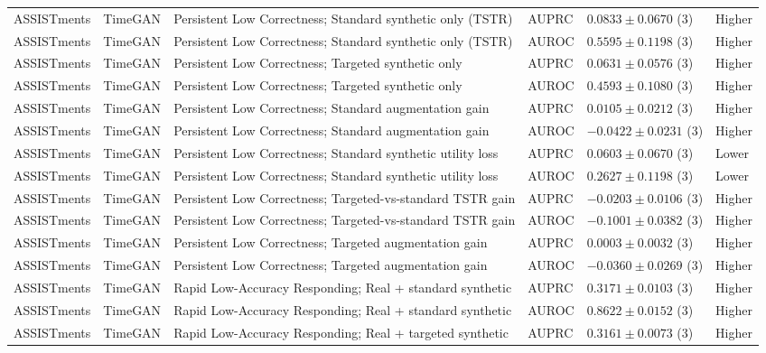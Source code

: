 \begin{longtable}{@{}p{2.25cm}p{2.05cm}p{4.7cm}p{5.0cm}p{2.6cm}p{1.25cm}@{}}
ASSISTments & TimeGAN & Persistent Low Correctness; Standard synthetic only (TSTR) & AUPRC & $0.0833 \mathbin{\pm} 0.0670$ (3) & Higher \\
ASSISTments & TimeGAN & Persistent Low Correctness; Standard synthetic only (TSTR) & AUROC & $0.5595 \mathbin{\pm} 0.1198$ (3) & Higher \\
ASSISTments & TimeGAN & Persistent Low Correctness; Targeted synthetic only & AUPRC & $0.0631 \mathbin{\pm} 0.0576$ (3) & Higher \\
ASSISTments & TimeGAN & Persistent Low Correctness; Targeted synthetic only & AUROC & $0.4593 \mathbin{\pm} 0.1080$ (3) & Higher \\
ASSISTments & TimeGAN & Persistent Low Correctness; Standard augmentation gain & AUPRC & $0.0105 \mathbin{\pm} 0.0212$ (3) & Higher \\
ASSISTments & TimeGAN & Persistent Low Correctness; Standard augmentation gain & AUROC & $-0.0422 \mathbin{\pm} 0.0231$ (3) & Higher \\
ASSISTments & TimeGAN & Persistent Low Correctness; Standard synthetic utility loss & AUPRC & $0.0603 \mathbin{\pm} 0.0670$ (3) & Lower \\
ASSISTments & TimeGAN & Persistent Low Correctness; Standard synthetic utility loss & AUROC & $0.2627 \mathbin{\pm} 0.1198$ (3) & Lower \\
ASSISTments & TimeGAN & Persistent Low Correctness; Targeted-vs-standard TSTR gain & AUPRC & $-0.0203 \mathbin{\pm} 0.0106$ (3) & Higher \\
ASSISTments & TimeGAN & Persistent Low Correctness; Targeted-vs-standard TSTR gain & AUROC & $-0.1001 \mathbin{\pm} 0.0382$ (3) & Higher \\
ASSISTments & TimeGAN & Persistent Low Correctness; Targeted augmentation gain & AUPRC & $0.0003 \mathbin{\pm} 0.0032$ (3) & Higher \\
ASSISTments & TimeGAN & Persistent Low Correctness; Targeted augmentation gain & AUROC & $-0.0360 \mathbin{\pm} 0.0269$ (3) & Higher \\
ASSISTments & TimeGAN & Rapid Low-Accuracy Responding; Real + standard synthetic & AUPRC & $0.3171 \mathbin{\pm} 0.0103$ (3) & Higher \\
ASSISTments & TimeGAN & Rapid Low-Accuracy Responding; Real + standard synthetic & AUROC & $0.8622 \mathbin{\pm} 0.0152$ (3) & Higher \\
ASSISTments & TimeGAN & Rapid Low-Accuracy Responding; Real + targeted synthetic & AUPRC & $0.3161 \mathbin{\pm} 0.0073$ (3) & Higher \\

\end{longtable}
